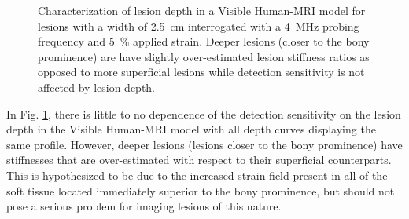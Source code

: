			\begin{figure}[!htb]
				\centering
				\caption[Quasi-static characterization of lesion depth in a Visible Human model]{Characterization of lesion depth in a Visible Human-MRI model for lesions with a width of \SI{2.5}{\cm} interrogated with a \SI{4}{\MHz} probing frequency and \SI{5}{\percent} applied strain. Deeper lesions (closer to the bony prominence) are have slightly over-estimated lesion stiffness ratios as opposed to more superficial lesions while detection sensitivity is not affected by lesion depth.}
				\label{fig:human_depth_characterization}
			\end{figure}

			In Fig. \ref{fig:human_depth_characterization}, there is little to no dependence of the detection sensitivity on the lesion depth in the Visible Human-MRI model with all depth curves displaying the same profile. However, deeper lesions (lesions closer to the bony prominence) have stiffnesses that are over-estimated with respect to their superficial counterparts. This is hypothesized to be due to the increased strain field present in all of the soft tissue located immediately superior to the bony prominence, but should not pose a serious problem for imaging lesions of this nature.

